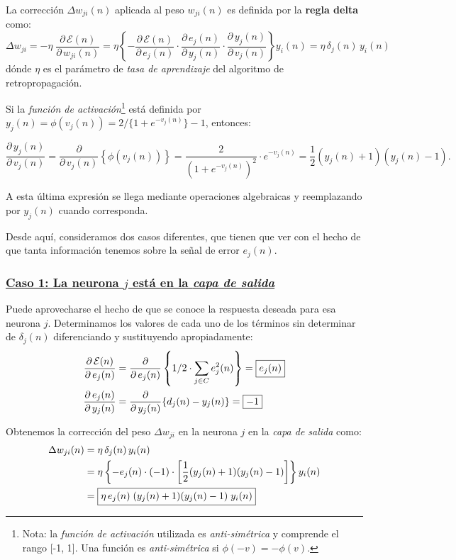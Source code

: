 \documentclass[10pt,a4paper]{article}
\begin{document}
La corrección $\Delta w_{ji}(n)$ aplicada al peso $w_{ji}(n)$ es definida por la \textbf{regla delta} como:
\[
\Delta w_{ji}=-\eta \; \frac{\partial \, \mathcal{E} (n)}{\partial \, w_{ji}(n)} =
\eta \left\{
-
\frac{\partial \, \mathcal{E} (n)}{\partial \, e_j(n)} \cdot
\frac{\partial \, e_j (n)}{\partial \, y_j(n)} \cdot
\frac{\partial \, y_j (n)}{\partial \, v_j(n)} 
\right\} y_i(n)
 = \eta \, \delta_j(n)\, y_i(n)
\]
dónde $\eta$ es el parámetro de \textit{tasa de aprendizaje} del algoritmo de retropropagación.

Si la \textit{función de activación}\footnote{Nota: la \textit{función de activación} utilizada es \textit{anti-simétrica} y comprende el rango [-1, 1]. Una función es \textit{anti-simétrica} si $\phi(-v)=-\phi(v)$. } está definida por $y_j(n)=\phi(v_j(n))=2/\{1+e^{-v_j(n)}\}-1$, entonces:

\[
\frac{\partial \, y_j (n)}{\partial \, v_j(n)}  =
\frac{\partial}{\partial \, v_j(n)} \left\{ \phi(v_j(n)) \right\}
= \frac{2}{(1+e^{-v_j(n)})^2} \cdot e^{-v_j(n)}
= \frac{1}{2}(y_j(n)+1)(y_j(n)-1).
\]

A esta última expresión se llega mediante operaciones algebraicas y reemplazando por $y_j(n)$ cuando corresponda.

Desde aquí, consideramos dos casos diferentes, que tienen que ver con el hecho de que tanta información tenemos sobre la señal de error $e_j(n)$.

\subsubsection*{\underline{Caso 1: La neurona $j$ está en la \textit{capa de salida}}}

Puede aprovecharse el hecho de que se conoce la respuesta deseada para esa neurona $j$. Determinamos los valores de cada uno de los términos sin determinar de $\delta_j(n)$ diferenciando y sustituyendo apropiadamente:
\begin{align*}
\frac{\partial \, \mathcal{E} (n)}{\partial \, e_j(n)} &=
\frac{\partial}{\partial \, e_j(n)} \left\{ 1/2 \cdot \sum_{j\in C} e_j^2(n) \right\}
= \fbox{$e_j(n)$} \\
%
\frac{\partial \, e_j (n)}{\partial \, y_j(n)} &=
\frac{\partial}{\partial \, y_j(n)} \{ d_j(n)-y_j(n) \}
= \fbox{$-1$} 
\end{align*} 

Obtenemos la corrección del peso $\Delta w_{ji}$ en la neurona $j$ en la \textit{capa de salida} como:
\begin{align*}
\Delta w_{ji} (n)
&= \eta \, \delta_j(n)\, y_i(n) \\
&=
\eta \left\{
-
e_j(n) \cdot
(-1) \cdot
\left[
\frac{1}{2}(y_j(n)+1)(y_j(n)-1)
\right]
\right\} y_i(n) \\
&=
\fbox{$\eta \, e_j(n)\;(y_j(n)+1)(y_j(n)-1)\; y_i(n)$}
\end{align*}
\end{document}
